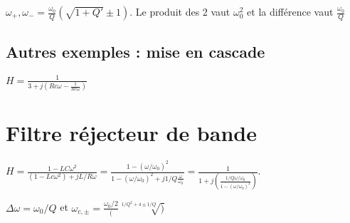 \documentclass[french]{yLectureNote}
\begin{document}
\(\omega_+, \omega_- = \frac{\omega_0}{Q} (\sqrt{1+Q'}\pm 1)\). Le produit des 2 vaut \(\omega_0^2\) et la différence vaut \(\frac{\omega_0}{Q}\)
\subsection{Autres exemples : mise en cascade}
\(H = \frac{1}{3+j(Rc\omega-\frac{1}{Rc\omega})}\)
\section{Filtre réjecteur de bande}
\(H = \frac{1-LC\omega^2}{(1-Lc\omega^2)+jL/R \omega} = \frac{1-(\omega/\omega_0)^2}{1-(\omega/\omega_0)^2+j1/Q \frac{\omega}{\omega_0}} = \frac{1}{1+j(\frac{1/Q \omega/\omega_0}{1-(\omega/\omega_0)^2})}\).

\(\Delta \omega = \omega_0/Q\) et \(\omega_{c,\pm} = \frac{\omega_0/2}(\sqrt[1/Q^2+4\pm 1/Q])\)
\end{document}
